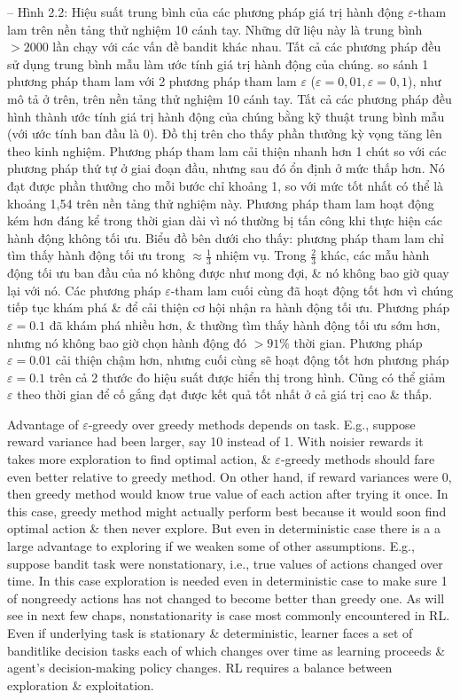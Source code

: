 \documentclass{article}
\begin{document}
\begin{itemize}
\begin{itemize}
        -- {\sf Hình 2.2: Hiệu suất trung bình của các phương pháp giá trị hành động $\varepsilon$-tham lam trên nền tảng thử nghiệm 10 cánh tay. Những dữ liệu này là trung bình $> 2000$ lần chạy với các vấn đề bandit khác nhau. Tất cả các phương pháp đều sử dụng trung bình mẫu làm ước tính giá trị hành động của chúng.} so sánh 1 phương pháp tham lam với 2 phương pháp tham lam $\varepsilon$ ($\varepsilon = 0,01,\varepsilon = 0,1$), như mô tả ở trên, trên nền tảng thử nghiệm 10 cánh tay. Tất cả các phương pháp đều hình thành ước tính giá trị hành động của chúng bằng kỹ thuật trung bình mẫu (với ước tính ban đầu là 0). Đồ thị trên cho thấy phần thưởng kỳ vọng tăng lên theo kinh nghiệm. Phương pháp tham lam cải thiện nhanh hơn 1 chút so với các phương pháp thứ tự ở giai đoạn đầu, nhưng sau đó ổn định ở mức thấp hơn. Nó đạt được phần thưởng cho mỗi bước chỉ khoảng 1, so với mức tốt nhất có thể là khoảng 1,54 trên nền tảng thử nghiệm này. Phương pháp tham lam hoạt động kém hơn đáng kể trong thời gian dài vì nó thường bị tấn công khi thực hiện các hành động không tối ưu. Biểu đồ bên dưới cho thấy: phương pháp tham lam chỉ tìm thấy hành động tối ưu trong $\approx\frac{1}{3}$ nhiệm vụ. Trong $\frac{2}{3}$ khác, các mẫu hành động tối ưu ban đầu của nó không được như mong đợi, \& nó không bao giờ quay lại với nó. Các phương pháp $\varepsilon$-tham lam cuối cùng đã hoạt động tốt hơn vì chúng tiếp tục khám phá \& để cải thiện cơ hội nhận ra hành động tối ưu. Phương pháp $\varepsilon = 0.1$ đã khám phá nhiều hơn, \& thường tìm thấy hành động tối ưu sớm hơn, nhưng nó không bao giờ chọn hành động đó $> 91\%$ thời gian. Phương pháp $\varepsilon = 0.01$ cải thiện chậm hơn, nhưng cuối cùng sẽ hoạt động tốt hơn phương pháp $\varepsilon = 0.1$ trên cả 2 thước đo hiệu suất được hiển thị trong hình. Cũng có thể giảm $\varepsilon$ theo thời gian để cố gắng đạt được kết quả tốt nhất ở cả giá trị cao \& thấp.

        Advantage of $\varepsilon$-greedy over greedy methods depends on task. E.g., suppose reward variance had been larger, say 10 instead of 1. With noisier rewards it takes more exploration to find optimal action, \& $\varepsilon$-greedy methods should fare even better relative to greedy method. On other hand, if reward variances were 0, then greedy method would know true value of each action after trying it once. In this case, greedy method might actually perform best because it would soon find optimal action \& then never explore. But even in deterministic case there is a a large advantage to exploring if we weaken some of other assumptions. E.g., suppose bandit task were nonstationary, i.e., true values of actions changed over time. In this case exploration is needed even in deterministic case to make sure 1 of nongreedy actions has not changed to become better than greedy one. As will see in next few chaps, nonstationarity is case most commonly encountered in RL. Even if underlying task is stationary \& deterministic, learner faces a set of banditlike decision tasks each of which changes over time as learning proceeds \& agent's decision-making policy changes. RL requires a balance between exploration \& exploitation.


\end{itemize}
\end{itemize}
\end{document}
